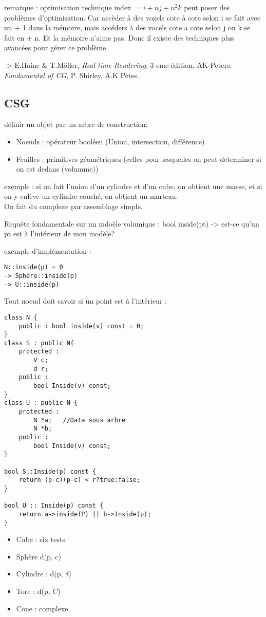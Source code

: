 \documentclass[11pt]{article}
\begin{document}
remarque : optimisation technique
index $= i + nj + n^2k$ peut poser des problèmes d'optimisation. Car accèder à des voxels cote à cote selon i se fait avec un + 1 dans la mémoire, mais accéders à des vocels cote a cote selon j ou k se fait en + n. Et la mémoire n'aime pas. Donc il existe des techniques plus avancées pour gérer ce problème.

-> E.Haine & T.Möller, \textit{Real time Rendering}, 3 eme édition, AK Peters.\\
\textit{Fundamental of CG}, P. Shirley, A.K Petes.


\subsection{CSG}
définir un objet par un arbre de construction:
\begin{itemize}
	\item Noeuds : opérateur booléen (Union, intersection, différence)
	\item Feuilles : primitives géométriques (celles pour lesquelles on peut determiner si on est dedans (volumme))
\end{itemize}

exemple : si on fait l'union d'un cylindre et d'un cube, on obtient une masse, et si on y enlève un cylindre couché, on obtient un marteau.\\

On fait du complexe par assemblage simple.

Requête fondamentale sur un mdoèle volumique : bool inside(pt) -> est-ce qu'un pt est à l'intérieur de mon modèle?

exemple d'implémentation : \\
\begin{verbatim}
N::inside(p) = 0
-> Sphère::inside(p)
-> U::inside(p)
\end{verbatim}
Tout noeud doit savoir si un point est à l'intérieur :
\begin{verbatim}
class N {
	public : bool inside(v) const = 0;
}
class S : public N{
	protected :
		V c;
		d r;
	public :
		bool Inside(v) const;
}
class U : public N {
	protected :
		N *a;	//Data sous arbre
		N *b;
	public :
		bool Inside(v) const;
}

bool S::Inside(p) const {
	return (p-c)(p-c) < r?true:false;
}

bool U :: Inside(p) const {
	return a->inside(P) || b->Inside(p);
}
\end{verbatim}

\begin{itemize}
	\item Cube : six tests
	\item Sphère d(p, c)
	\item Cylindre : d(p, $\delta$)
	\item Tore : d(p, $C$)
	\item Cone : complexe
\end{itemize}
\end{document}
